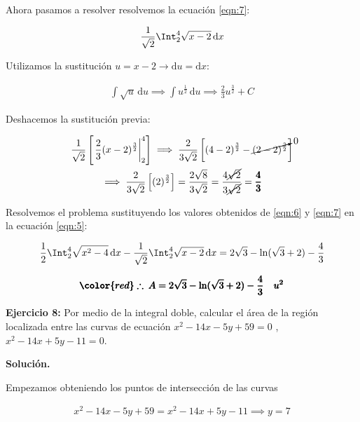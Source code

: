\documentclass[12pt]{article}
\begin{document}
\noindent Ahora pasamos a resolver resolvemos la ecuación \eqref{eqn:7}:

\begin{align*}
	\frac{1}{\sqrt{2}} \Int_2^4 \sqrt{x-2}\, \mathrm{d}x
\end{align*}

\noindent Utilizamos la sustitución $u=x-2 \to \mathrm{d}u = \mathrm{d}x$:

\begin{align*}
	\int \sqrt{u}\, \mathrm{d}u \implies \int u^{\frac{1}{2}}\, \mathrm{d}u \implies \frac{2}{3}u^{\frac{3}{2}} + C
\end{align*}

\noindent Deshacemos la sustitución previa:

\begin{multline*}
	\frac{1}{\sqrt{2}}\left[\left.\frac{2}{3}(x-2)^{\frac{3}{2}}\right|_2^4\right] \implies \frac{2}{3\sqrt{2}} \left[(4-2)^{\frac{3}{2}} - \cancelto{0}{(2-2)^{\frac{3}{2}}}\right]\\ \implies \frac{2}{3\sqrt{2}} \left[(2)^{\frac{3}{2}}\right] = \frac{2\sqrt{8}}{3\sqrt{2}} = \frac{4\cancel{\sqrt{2}}}{3\cancel{\sqrt{2}}} = \pmb{\frac{4}{3}}
\end{multline*}

\noindent Resolvemos el problema sustituyendo los valores obtenidos de \eqref{eqn:6} y \eqref{eqn:7} en la ecuación \eqref{eqn:5}:

\begin{align}
	\frac{1}{2} \Int_2^4 \sqrt{x^2-4}\, \mathrm{d}x - \frac{1}{\sqrt{2}} \Int_2^4 \sqrt{x-2}\, \mathrm{d}x = 2\sqrt{3} - \ln(\sqrt{3}+2) - \frac{4}{3}
\end{align}

\begin{align*}
	 \pmb{\color{red} \therefore\: A = 2\sqrt{3} - \ln(\sqrt{3}+2) - \frac{4}{3}\quad u^2}
\end{align*}

\noindent \textbf{Ejercicio 8:} Por medio de la integral doble, calcular el área
de la región localizada entre las curvas de ecuación $x^2 -14x -5y +59 = 0$ , 
$x^2-14x+5y-11=0$.

\vspace{5mm}

\noindent \textbf{Solución.}
 
\vspace{5mm}

Empezamos obteniendo los puntos de intersección de las curvas

\begin{align*}
	x^2 -14x -5y +59 = x^2-14x+5y-11 \implies y = 7
\end{align*}
\end{document}

